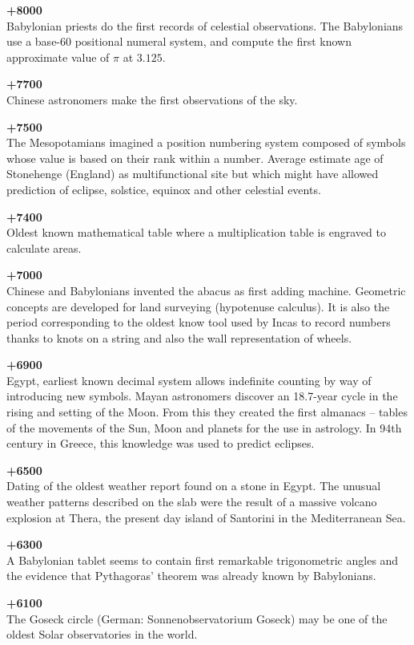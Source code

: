 \textbf{+8000}\\
Babylonian priests do the first records of celestial observations.  The Babylonians use a base-60 positional numeral system, and compute the first known approximate value of $\pi$ at $3.125$.

\textbf{+7700}\\
Chinese astronomers make the first observations of the sky.

\textbf{+7500}\\
The Mesopotamians imagined a position numbering system composed of symbols whose value is based on their rank within a number. Average estimate age of Stonehenge (England) as multifunctional site but which might have allowed prediction of eclipse, solstice, equinox and other celestial events.

\textbf{+7400}\\
Oldest known mathematical table where a multiplication table is engraved to calculate areas.

\textbf{+7000}\\
Chinese and Babylonians invented the abacus as first adding machine. Geometric concepts are developed for land surveying (hypotenuse calculus). It is also the period corresponding to the oldest know tool used by Incas to record numbers thanks to knots on a string and also the wall representation of wheels.

\textbf{+6900}\\
Egypt, earliest known decimal system allows indefinite counting by way of introducing new symbols. Mayan astronomers discover an 18.7-year cycle in the rising and setting of the Moon. From this they created the first almanacs – tables of the movements of the Sun, Moon and planets for the use in astrology. In 94th century in Greece, this knowledge was used to predict eclipses.

\textbf{+6500}\\
Dating of the oldest weather report found on a stone in Egypt. The unusual weather patterns described on the slab were the result of a massive volcano explosion at Thera, the present day island of Santorini in the Mediterranean Sea.

\textbf{+6300}\\
A Babylonian tablet seems to contain first remarkable trigonometric angles and the evidence that Pythagoras' theorem was already known by Babylonians.

\textbf{+6100}\\
The Goseck circle (German: Sonnenobservatorium Goseck) may be one of the oldest Solar observatories in the world.

